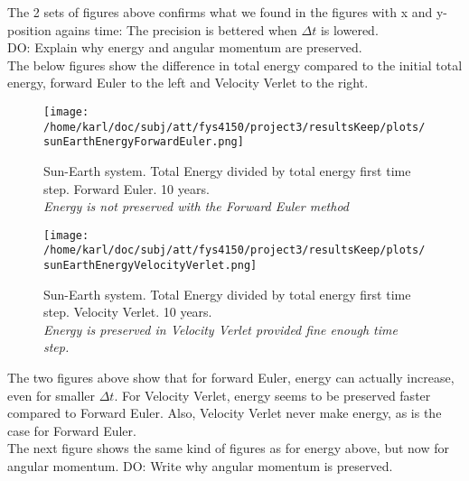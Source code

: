 \documentclass{article}
\begin{document}
The 2 sets of figures above confirms what we found in the figures with x and y-position agains time: The precision is bettered when $\Delta t$ is lowered. \\

DO: Explain why energy and angular momentum are preserved.\\

The below figures show the difference in total energy compared to the initial total energy, forward Euler to the left and Velocity Verlet to the right.


\begin{minipage}{.49\textwidth} 
	\begin{figure}[H]
		\centering
		\texttt{[image: /home/karl/doc/subj/att/fys4150/project3/resultsKeep/plots/sunEarthEnergyForwardEuler.png]}
		\caption{Sun-Earth system. Total Energy divided by total energy first time step. Forward Euler. 10 years. \\ \textit{Energy is not preserved with the Forward Euler method}}
		\label{1}
	\end{figure}
\end{minipage}\hfill
\begin{minipage}{.49\textwidth} 
	\begin{figure}[H]
		\centering
		\texttt{[image: /home/karl/doc/subj/att/fys4150/project3/resultsKeep/plots/sunEarthEnergyVelocityVerlet.png]}
		\caption{Sun-Earth system. Total Energy divided by total energy first time step. Velocity Verlet. 10 years. \\ \textit{Energy is preserved in Velocity Verlet provided fine enough time step. }}
		\label{1}
	\end{figure}
\end{minipage}\hfill
\vspace{2ex}

The two figures above show that for forward Euler, energy can actually increase, even for smaller $\Delta t$. For Velocity Verlet, energy seems to be preserved faster compared to Forward Euler. Also, Velocity Verlet never make energy, as is the case for Forward Euler.\\

The next figure shows the same kind of figures as for energy above, but now for angular momentum. DO: Write why angular momentum is preserved.
\end{document}
